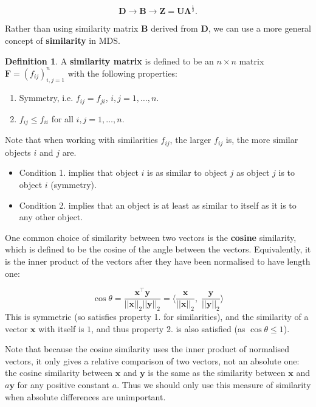 \documentclass[]{book}
\providecommand{\tightlist}{%
  \setlength{\itemsep}{0pt}\setlength{\parskip}{0pt}}
\theoremstyle{definition}
\newtheorem{definition}{Definition}[chapter]
\theoremstyle{definition}
\theoremstyle{definition}
\theoremstyle{remark}
\begin{document}
\[\mathbf D\longrightarrow \mathbf B\longrightarrow \mathbf Z=\mathbf U\boldsymbol \Lambda^{\frac{1}{2}}.\]

Rather than using similarity matrix \(\mathbf B\) derived from \(\mathbf D\), we can use a more general concept of \textbf{similarity} in MDS.

\begin{definition}
\protect\hypertarget{def:unnamed-chunk-21}{}{\label{def:unnamed-chunk-21} }A \textbf{similarity matrix} is defined to be an \(n \times n\) matrix \({\mathbf F}=(f_{ij})_{i,j=1}^n\) with the following properties:

\begin{enumerate}
\def\labelenumi{\arabic{enumi}.}
\tightlist
\item
  Symmetry, i.e. \(f_{ij} =f_{ji}\), \(i,j=1, \ldots , n\).
\item
  \(f_{ij} \leq f_{ii}\) for all \(i,j=1, \ldots , n\).
\end{enumerate}
\end{definition}

Note that when working with similarities \(f_{ij}\), the larger \(f_{ij}\) is, the more similar objects \(i\) and \(j\) are.

\begin{itemize}
\item
  Condition 1. implies that object \(i\) is as similar to object \(j\) as object \(j\) is to object \(i\) (symmetry).
\item
  Condition 2. implies that an object is at least as similar to itself as it is to any other object.
\end{itemize}

One common choice of similarity between two vectors is the \textbf{cosine} similarity, which is defined to be the cosine of the angle between the vectors. Equivalently, it is the inner product of the vectors after they have been normalised to have length one:

\[\cos \theta = \frac{\mathbf x^\top \mathbf y}{||\mathbf x||_2 ||\mathbf y||_2}=\langle \frac{\mathbf x}{||\mathbf x||_2}, \; \frac{\mathbf y}{||\mathbf y||_2}\rangle\]
This is symmetric (so satisfies property 1. for similarities), and the similarity of a vector \(\mathbf x\) with itself is \(1\), and thus property 2. is also satisfied (as \(\cos \theta \leq 1\)).

Note that because the cosine similarity uses the inner product of normalised vectors, it only gives a relative comparison of two vectors, not an absolute one: the cosine similarity between \(\mathbf x\) and \(\mathbf y\) is the same as the similarity between \(\mathbf x\) and \(a\mathbf y\) for any positive constant \(a\). Thus we should only use this measure of similarity when absolute differences are unimportant.
\end{document}
